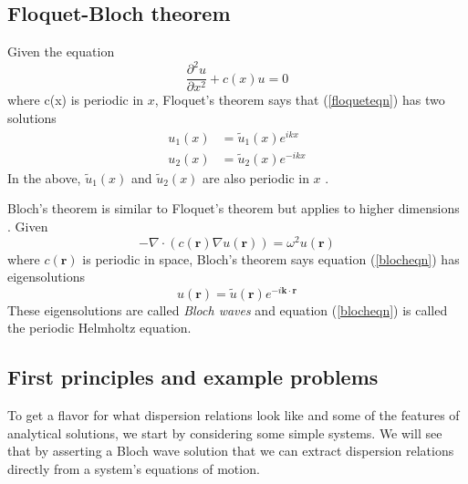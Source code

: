 \documentclass{article}
\begin{document}
\subsection{Floquet-Bloch theorem} \label{fbt}
Given the equation
\begin{equation} \label{floqueteqn}
\frac{\partial^2 u}{\partial x^2} + c(x)u = 0
\end{equation}
where c(x) is periodic in $x$, Floquet's theorem says that 
(\ref{floqueteqn}) has two solutions
\begin{align*}
u_1(x) &= \tilde{u}_1(x)e^{ikx} \\
u_2(x) &= \tilde{u}_2(x)e^{-ikx}
\end{align*}
In the above, $\tilde{u}_1(x)$ and $\tilde{u}_2(x)$ are also periodic in $x$ 
\cite{magnus79}.

Bloch's theorem is similar to Floquet's theorem but applies to higher 
dimensions \cite{laude15}. Given
\begin{equation} \label{blocheqn}
-\nabla \cdot \left( c(\mathbf{r}) \nabla u(\mathbf{r}) \right) = \omega^2 
u(\mathbf{r})
\end{equation}
where $c(\mathbf{r})$ is periodic in space, Bloch's theorem says 
equation (\ref{blocheqn}) has eigensolutions
\begin{equation}
u(\mathbf{r}) = \tilde{u}(\mathbf{r}) e^{-i\mathbf{k} \cdot \mathbf{r}} 
\end{equation}
These eigensolutions are called \emph{Bloch waves} and equation 
(\ref{blocheqn}) is called the periodic Helmholtz equation.

\subsection{First principles and example problems}
To get a flavor for what dispersion relations look like and some of the 
features of analytical solutions, we start by considering some simple 
systems. We will see that by asserting a Bloch wave solution that we can 
extract dispersion relations directly from a system's equations of motion.
\end{document}

